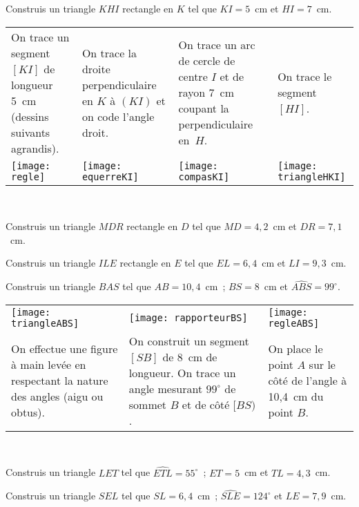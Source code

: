 \begin{methode*1}

\begin{exemple*1}
Construis un triangle $KHI$ rectangle en $K$ tel que $KI = 5$ cm et $HI = 7$ cm. \\[1em]
\begin{tabularx}{\textwidth}{X|X|X|X}
 On trace un segment $[KI]$ de longueur 5 cm (dessins suivants agrandis). & On trace la droite perpendiculaire en $K$ à $(KI)$ et on code l'angle droit. & On trace un arc de cercle de centre $I$ et de rayon 7 cm coupant la perpendiculaire en $H$. & On trace le segment $[HI]$.\\
 \texttt{[image: regle]} & \texttt{[image: equerreKI]} & \texttt{[image: compasKI]} & \texttt{[image: triangleHKI]} \\ 
\end{tabularx} \\

\end{exemple*1}

\exercice 
Construis un triangle $MDR$ rectangle en $D$ tel que $MD = 4,2$ cm et $DR = 7,1$ cm. 
 
\exercice
Construis un triangle $ILE$ rectangle en $E$ tel que $EL = 6,4$ cm et $LI = 9,3$ cm.
 
\end{methode*1}


\begin{methode*1}

 \begin{exemple*1}
Construis un triangle $BAS$ tel que $AB = 10,4$ cm ; $BS = 8$ cm et $\widehat{ABS} = 99^\circ$. \\[1em]
\begin{tabularx}{\textwidth}{X|X|X}
 \texttt{[image: triangleABS]} &  \texttt{[image: rapporteurBS]} & \texttt{[image: regleABS]} \\ 
 On effectue une figure à main levée en respectant la nature des angles (aigu ou obtus). & On construit un segment $[SB]$ de 8 cm de longueur. On trace un angle mesurant $99^\circ$ de sommet $B$ et de côté $[BS)$. & On place le point $A$ sur le côté de l'angle à 10,4 cm du point $B$. \\
\end{tabularx} \\

\end{exemple*1}

\exercice
Construis un triangle $LET$ tel que $\widehat{ETL} = 55^\circ$ ; $ET = 5$ cm et $TL = 4,3$ cm.

\exercice
Construis un triangle $SEL$ tel que $SL = 6,4$ cm ; $\widehat{SLE}= 124^\circ$ et $LE = 7,9$ cm.
 
\end{methode*1}


